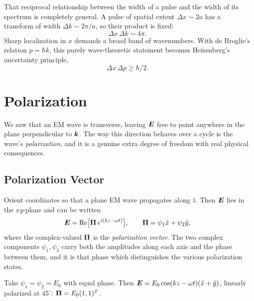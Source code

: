 That reciprocal relationship between the width of a pulse and the width of its spectrum is completely general. A pulse of spatial extent $\Delta x \sim 2a$ has a transform of width $\Delta k \sim 2\pi/a$, so their product is fixed:
\begin{equation}
    \Delta x\,\Delta k \sim 4\pi.
\end{equation}
Sharp localization in $x$ demands a broad band of wavenumbers. With de Broglie's relation $p = \hbar k$, this purely wave-theoretic statement becomes Heisenberg's uncertainty principle,
\begin{equation}
    \Delta x\,\Delta p \ge \hbar/2.
\end{equation}

\section{Polarization}

We saw that an EM wave is transverse, leaving $\vect{E}$ free to point anywhere in the plane perpendicular to $\bm{k}$. The way this direction behaves over a cycle is the wave's \emph{polarization}, and it is a genuine extra degree of freedom with real physical consequences.

\subsection{Polarization Vector}

Orient coordinates so that a plane EM wave propagates along $\hat{z}$. Then $\vect{E}$ lies in the $xy$-plane and can be written
\begin{equation}
    \vect{E} = \operatorname{Re}\bigl[\vect{\Pi}\, e^{i(kz - \omega t)}\bigr], \qquad
    \vect{\Pi} = \psi_1\hat{x} + \psi_2\hat{y},
\end{equation}
where the complex-valued $\vect{\Pi}$ is the \emph{polarization vector}. The two complex components $\psi_1,\psi_2$ carry both the amplitudes along each axis and the phase between them, and it is that phase which distinguishes the various polarization states.

\begin{example}
Take $\psi_1 = \psi_2 = E_0$ with equal phase. Then $\vect{E} = E_0\cos(kz-\omega t)(\hat{x} + \hat{y})$, linearly polarized at $45^\circ$: $\vect{\Pi} = E_0(1,1)^T$.
\end{example}

